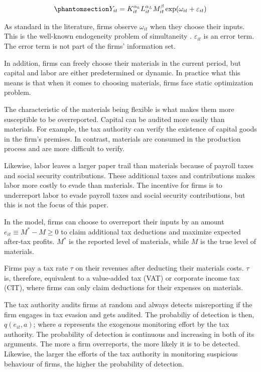 \documentclass[
  12pt]{article}
\theoremstyle{definition}
\theoremstyle{remark}
\begin{document}
\begin{equation}\phantomsection\label{eq-prod-fn}{
Y_{it}=K_{it}^{\alpha_k}L_{it}^{\alpha_L}M_{it}^{\beta}\exp(\omega_{it}+\varepsilon_{it})
}\end{equation}

As standard in the literature, firms observe \(\omega_{it}\) when they
choose their inputs. This is the well-known endogeneity problem of
simultaneity \citep{Griliches1995}. \(\varepsilon_{it}\) is an error
term. The error term is not part of the firms' information set.

In addition, firms can freely choose their materials in the current
period, but capital and labor are either predetermined or dynamic. In
practice what this means is that when it comes to choosing materials,
firms face static optimization problem.

The characteristic of the materials being flexible is what makes them
more susceptible to be overreported. Capital can be audited more easily
than materials. For example, the tax authority can verify the existence
of capital goods in the firm's premises. In contrast, materials are
consumed in the production process and are more difficult to verify.

Likewise, labor leaves a larger paper trail than materials because of
payroll taxes and social security contributions. These additional taxes
and contributions makes labor more costly to evade than materials. The
incentive for firms is to underreport labor to evade payroll taxes and
social security contributions, but this is not the focus of this paper.

In the model, firms can choose to overreport their inputs by an amount
\(e_{it}\equiv M^*-M\ge0\) to claim additional tax deductions and
maximize expected after-tax profits. \(M^*\) is the reported level of
materials, while \(M\) is the true level of materials.

Firms pay a tax rate \(\tau\) on their revenues after deducting their
materials costs. \(\tau\) is, therefore, equivalent to a value-added tax
(VAT) or corporate income tax (CIT), where firms can only claim
deductions for their expenses on materials.

The tax authority audits firms at random and always detects misreporting
if the firm engages in tax evasion and gets audited. The probabiliy of
detection is then, \(q(e_{it},a)\); where \(a\) represents the exogenous
monitoring effort by the tax authority. The probability of detection is
continuous and increasing in both of its arguments. The more a firm
overreports, the more likely it is to be detected. Likewise, the larger
the efforts of the tax authority in monitoring suspicious behaviour of
firms, the higher the probability of detection.
\end{document}
